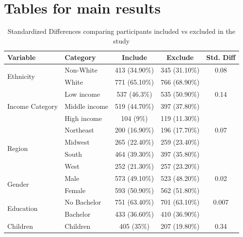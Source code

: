 \documentclass[12pt]{article}
\begin{document}
\clearpage










\section{Tables for main results}

\begin{table}[htbp]
\centering
\footnotesize
\caption{Standardized Differences comparing participants included vs excluded in the study}
\label{tab:Incomplete}
\begin{threeparttable}
\begin{tabular}{llccc}
\toprule
\textbf{Variable} & \textbf{Category} & \textbf{Include} & \textbf{Exclude} & \textbf{Std. Diff} \\
\midrule
\multirow{2}{*}{Ethnicity} & Non-White & 413 (34.90\%) & 345 (31.10\%) & 0.08 \\
                           & White     & 771 (65.10\%) & 766 (68.90\%) & \\
\midrule
\multirow{3}{*}{Income Category} & Low income    & 537 (46.3\%) & 535 (50.90\%) & 0.14 \\
                                 & Middle income & 519 (44.70\%) & 397 (37.80\%) & \\
                                 & High income   & 104 (9\%)  & 119 (11.30\%) & \\
\midrule
\multirow{4}{*}{Region} & Northeast & 200 (16.90\%) & 196 (17.70\%) & 0.07 \\
                        & Midwest   & 265 (22.40\%) & 259 (23.40\%) & \\
                        & South     & 464 (39.30\%) & 397 (35.80\%) & \\
                        & West      & 252 (21.30\%) & 257 (23.20\%) & \\
\midrule
\multirow{2}{*}{Gender} & Male   & 573 (49.10\%) & 523 (48.20\%) & 0.02 \\
                        & Female & 593 (50.90\%) & 562 (51.80\%) & \\
\midrule
\multirow{2}{*}{Education} & No Bachelor & 751 (63.40\%) & 701 (63.10\%) & 0.007 \\
                           & Bachelor    &  433   (36.60\%)        &   410 (36.90\%)          &  \\
\midrule
\multirow{2}{*}{Children} & Children     & 405 (35\%) & 207 (19.80\%) & 0.34 \\

\end{tabular}
\end{threeparttable}
\end{table}
\end{document}
